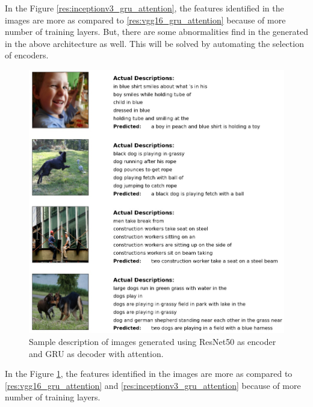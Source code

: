 \noindent In the Figure \ref{res:inceptionv3_gru_attention}, the features identified in the images are more as compared to \ref{res:vgg16_gru_attention} because of more number of training layers. But, there are some abnormalities find in the generated in the above architecture as well. This will be solved by automating the selection of encoders.
\newpage
\begin{figure}[ht!]
    \includegraphics[scale=0.35]{chapters/5/intfig/resnet_and_gru_with_attention_output.jpg}
    \caption{Sample description of images generated using ResNet50 as encoder and GRU as decoder with attention.}
    \label{res:resnet50_gru_attention}
\end{figure}
\noindent In the Figure \ref{res:resnet50_gru_attention}, the features identified in the images are more as compared to \ref{res:vgg16_gru_attention} and \ref{res:inceptionv3_gru_attention} because of more number of training layers.

